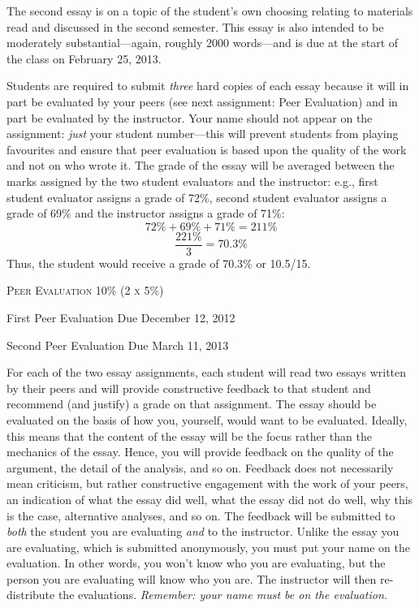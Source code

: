 \documentclass[12pt]{article}
\begin{document}
The second essay is on a topic of the student's own choosing relating to materials read and discussed in the second semester. This essay is also intended to be moderately substantial---again, roughly 2000 words---and is due at the start of the class on February 25, 2013.

Students are required to submit \textit{three} hard copies of each essay because it will in part be evaluated by your peers (see next assignment: Peer Evaluation) and in part be evaluated by the instructor. Your name should not appear on the assignment: \textit{just} your student number---this will prevent students from playing favourites and ensure that peer evaluation is based upon the quality of the work and not on who wrote it. The grade of the essay will be averaged between the marks assigned by the two student evaluators and the instructor: e.g., first student evaluator assigns a grade of 72\%, second student evaluator assigns a grade of 69\% and the instructor assigns a grade of 71\%:
\[
72\% + 69\% + 71\% = 211\%
\]
\[
{\frac{221\%}{3}}=70.3\%
\]
Thus, the student would receive a grade of 70.3\% or 10.5/15.

{\large \textsc{Peer Evaluation 10\% (2 x 5\%)}}

\hspace{.5in} First Peer Evaluation Due December 12, 2012

\hspace{.5in} Second Peer Evaluation Due March 11, 2013

For each of the two essay assignments, each student will read two essays written by their peers and will provide constructive feedback to that student and recommend (and justify) a grade on that assignment. The essay should be evaluated on the basis of how you, yourself, would want to be evaluated. Ideally, this means that the content of the essay will be the focus rather than the mechanics of the essay. Hence, you will provide feedback on the quality of the argument, the detail of the analysis, and so on. Feedback does not necessarily mean criticism, but rather constructive engagement with the work of your peers, an indication of what the essay did well, what the essay did not do well, why this is the case, alternative analyses, and so on. The feedback will be submitted to \textit{both} the student you are evaluating \textit{and} to the instructor. Unlike the essay you are evaluating, which is submitted anonymously, you must put your name on the evaluation. In other words, you won't know who you are evaluating, but the person you are evaluating will know who you are. The instructor will then re-distribute the evaluations. \textit{Remember: your name must be on the evaluation.}
\end{document}
